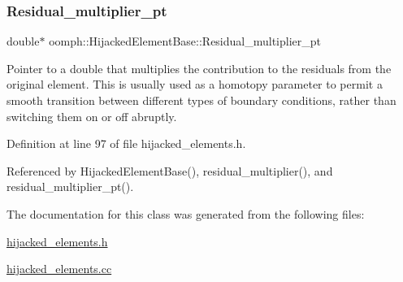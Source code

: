 \mbox{\label{classoomph_1_1HijackedElementBase_a283509b7af09479e7a1cb8c0e05a8c16}} 
\subsubsection{\texorpdfstring{Residual\+\_\+multiplier\+\_\+pt}{Residual\_multiplier\_pt}}
{\footnotesize\ttfamily double$\ast$ oomph\+::\+Hijacked\+Element\+Base\+::\+Residual\+\_\+multiplier\+\_\+pt\hspace{0.3cm}{\ttfamily [protected]}}



Pointer to a double that multiplies the contribution to the residuals from the original element. This is usually used as a homotopy parameter to permit a smooth transition between different types of boundary conditions, rather than switching them on or off abruptly. 



Definition at line 97 of file hijacked\+\_\+elements.\+h.



Referenced by Hijacked\+Element\+Base(), residual\+\_\+multiplier(), and residual\+\_\+multiplier\+\_\+pt().



The documentation for this class was generated from the following files\+:\begin{DoxyCompactItemize}
\item 
\hyperlink{hijacked__elements_8h}{hijacked\+\_\+elements.\+h}\item 
\hyperlink{hijacked__elements_8cc}{hijacked\+\_\+elements.\+cc}\end{DoxyCompactItemize}
